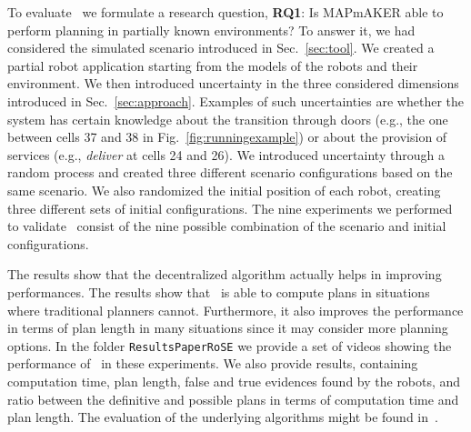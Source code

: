 

To evaluate  \toolName\ we formulate a research question,
\textbf{RQ1}: Is MAPmAKER able to perform planning in partially known environments?
To answer it, we  had considered the simulated scenario introduced in Sec.~\ref{sec:tool}.
We created a partial robot application starting from the models of the robots and their environment.
We then introduced uncertainty in the three considered dimensions introduced in Sec.~\ref{sec:approach}.
Examples of such uncertainties are whether the system has certain knowledge about the transition through doors (e.g., the one between cells 37 and 38 in Fig.~\ref{fig:runningexample}) or about the provision of services (e.g., \emph{deliver} at cells 24 and 26).
We introduced uncertainty through a random process and created three different scenario configurations based on the same scenario.
We also randomized the initial position of each robot, creating three different sets of initial configurations.
The nine experiments we performed to validate \toolName~consist of the nine possible combination of the scenario and initial configurations.

The results show that the decentralized algorithm actually helps in improving performances.
The results show that \toolName~is able to compute plans in situations where traditional planners cannot. 
Furthermore, it also improves the performance in terms of plan length in many situations since it may consider more planning options.
In the folder \texttt{ResultsPaperRoSE} we provide a set of videos showing the performance of \toolName~in these experiments.
We also provide results, containing computation time, plan length, false and true evidences found by the robots, and ratio between the definitive and possible plans in terms of computation time and plan length.
The evaluation of the underlying algorithms might be found in~\cite{menghi2018multi}. 

